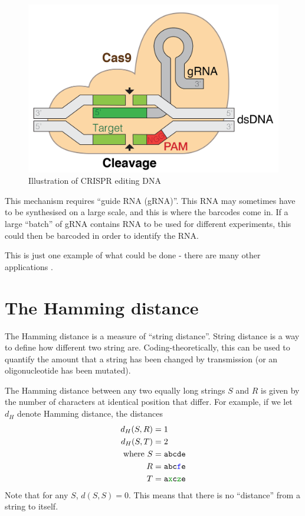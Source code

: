 \documentclass[a4paper,11pt]{article}
\begin{document}
\begin{figure}[H]
\begin{center}
\includegraphics{../images/GRNA-Cas9.png}
\end{center}
\caption{Illustration of CRISPR editing DNA}\label{fig:crispr}
\end{figure}

    This mechanism requires ``guide RNA (gRNA)''. This RNA may sometimes have to
    be synthesised on a large scale, and this is where the barcodes come in. If
    a large ``batch'' of gRNA contains RNA to be used for different experiments,
    this could then be barcoded in order to identify the RNA.

    This is just one example of what could be done - there are many other
    applications \cite{WikiBarcoding}.

    \section{The Hamming distance}

    The Hamming distance is a measure of ``string distance''. String
    distance is a way to define how different two string are.
    Coding-theoretically, this can be used to quantify the amount that a
    string has been changed by transmission (or an oligonucleotide has been
    mutated).

    The Hamming distance between any two equally long strings $S$ and $R$
    is given by the number of characters at identical position that differ.
    For example, if we let $d_H$ denote Hamming distance, the distances
    \begin{align*}
    d_H(S, R) &= 1\\
    d_H(S, T) &= 2\\
    \text{where}\
    S &= \texttt{abcde}\\
    R &= \texttt{abc\textcolor{blue}{f}e}\\
    T &= \texttt{a\textcolor{codegreen}{x}c\textcolor{codegreen}{z}e}
    \end{align*}
    Note that for any $S$, $d(S, S) = 0$. This means that there is no
    ``distance'' from a string to itself.
\end{document}
